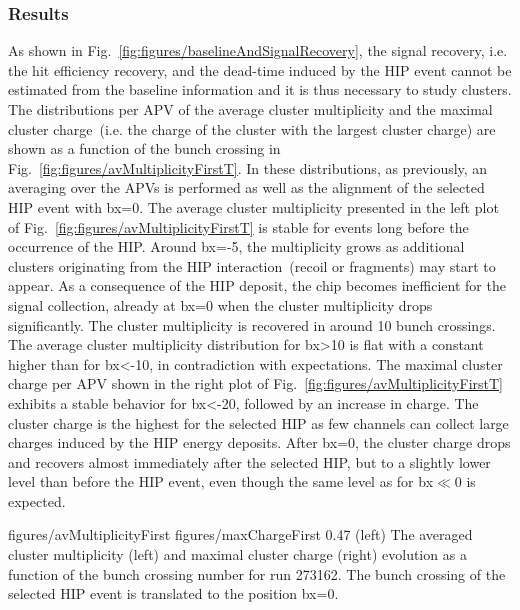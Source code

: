 \subsubsection{Results}

As shown in Fig.~\ref{fig:figures/baselineAndSignalRecovery}, the signal recovery, i.e. the hit efficiency recovery, and the dead-time induced by the HIP event cannot be estimated from the baseline information and it is thus necessary to study clusters. The distributions per APV of the average cluster multiplicity and the maximal cluster charge~(i.e. the charge of the cluster with the largest cluster charge)  are shown as a function of the bunch crossing in Fig.~\ref{fig:figures/avMultiplicityFirstT}. In these distributions, as previously, an averaging over the APVs is performed as well as the alignment of the selected HIP event with bx=0. The average cluster multiplicity presented in the left plot of Fig.~\ref{fig:figures/avMultiplicityFirstT} is stable for events long before the occurrence of the HIP. Around bx=-5, the multiplicity grows as additional clusters originating from the HIP interaction~(recoil or fragments) may start to appear. As a consequence of the HIP deposit, the chip becomes inefficient for the signal collection, already at bx=0 when  the cluster multiplicity drops significantly. The cluster multiplicity is recovered in around 10 bunch crossings. The average cluster multiplicity distribution for bx>10 is flat with a constant higher than for bx<-10, in contradiction with expectations. The maximal cluster charge per APV shown in the right plot of Fig.~\ref{fig:figures/avMultiplicityFirstT} exhibits a stable behavior for bx<-20, followed by an increase in charge. The cluster charge is the highest for the selected HIP as few channels can collect large charges induced by the HIP energy deposits. After bx=0, the cluster charge drops and recovers almost immediately after the selected HIP, but to a slightly lower level than before the HIP event, even though the same level as for bx$\ll$0 is expected. 

                 {figures/avMultiplicityFirst} %
                 {figures/maxChargeFirst} %
                 {0.47}       %
                 {(left) The averaged cluster multiplicity (left) and maximal cluster charge (right) evolution as a function of the bunch crossing number for run 273162. The bunch crossing of the selected HIP event is translated to the position bx=0. } %

